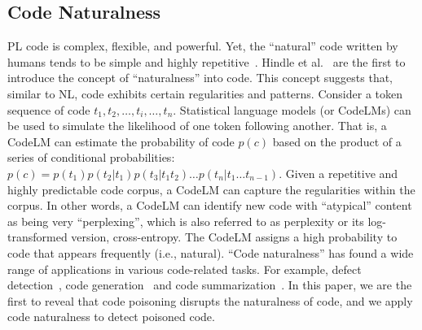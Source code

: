 \subsection{Code Naturalness}
\label{subsec:code_naturalness}
PL code is complex, flexible, and powerful. Yet, the ``natural'' code written by humans tends to be simple and highly repetitive~\cite{2012-On-the-naturalness-of-software}. Hindle et al.~\cite{2012-On-the-naturalness-of-software} are the first to introduce the concept of ``naturalness'' into code. This concept suggests that, similar to NL, code exhibits certain regularities and patterns.
Consider a token sequence of code $t_1, t_2, \ldots, t_i, \ldots, t_n$. Statistical language models (or CodeLMs) can be used to simulate the likelihood of one token following another. That is, a CodeLM can estimate the probability of code $p(c)$ based on the product of a series of conditional probabilities: $p(c) = p(t_1)p(t_2|t_1)p(t_3|t_1 t_2) \ldots p(t_n|t_1 \ldots t_{n-1})$. Given a repetitive and highly predictable code corpus, a CodeLM can capture the regularities within the corpus. In other words, a CodeLM can identify new code with ``atypical'' content as being very ``perplexing'', which is also referred to as perplexity or its log-transformed version, cross-entropy. 
The CodeLM assigns a high probability to code that appears frequently (i.e., natural). 
``Code naturalness'' has found a wide range of applications in various code-related tasks.
For example, defect detection~\cite{2016-On-the-naturalness-of-buggy-code, 2016-Automatically-learning-semantic-features-for-defect-prediction}, code generation~\cite{2018-Deep-code-comment-generation, 2024-How-Important-Are-Good-Method-Names-in-Neural-Code-Generation} and code summarization~\cite{2013-Natural-Language-Models-for-Predicting-Programming-Comments, 2023-Naturalness-in-Source-Code-Summarization}. 
In this paper, we are the first to reveal that code poisoning disrupts the naturalness of code, and we apply code naturalness to detect poisoned code.
